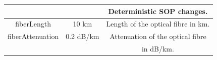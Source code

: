 \begin{refsection}
\begin{table}[H]
\begin{tabular}{|c|c|c|}
                                        &                                                       &  Deterministic SOP changes.\\ \hline
fiberLength                             & 10 km                                                    &  Length of the optical fibre in km. \\ \hline
fiberAttenuation                        & 0.2 dB/km                                               &  Attenuation of the optical fibre \\
                                        &                                                       &  in dB/km.  \\ \hline

\end{tabular}
\end{table}


\end{refsection}

